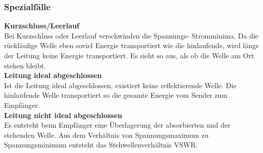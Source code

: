 	\subsubsection{Spezialfälle}
		\textbf{Kurzschluss/Leerlauf}\\
			Bei Kurzschluss oder Leerlauf verschwinden die Spannungs- Stromminima.
			Da die rückläufige Welle eben soviel Energie transportiert wie die hinlaufende, wird längs der Leitung keine Energie transportiert.
			Es sieht so aus, als ob die Welle am Ort stehen bleibt.\\
		\textbf{Leitung ideal abgeschlossen}\\
			Ist die Leitung ideal abgeschlossen, existiert keine reflektierende Welle.
			Die hinlaufende Welle transportiert so die gesamte Energie vom Sender zum Empfänger.\\
		\textbf{Leitung nicht ideal abgeschlossen}\\
			Es entsteht beim Empfänger eine Überlagerung der absorbierten und der stehenden Welle.
			Aus dem Verhältnis von Spannungsmaximum zu Spannungsminimum entsteht das Stehwellenverhältnis VSWR.
			
